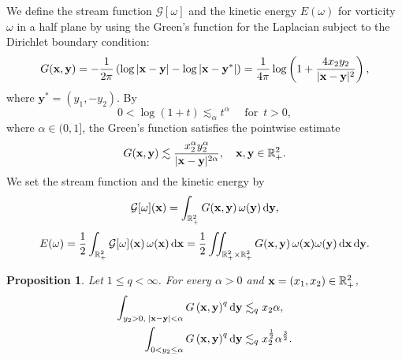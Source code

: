 \documentclass[11pt]{amsart}
\newtheorem{proposition}[theorem]{Proposition}
\theoremstyle{definition}
\theoremstyle{definition}
\numberwithin{equation}{section}
\newcommand{\0}{\emptyset}
\newcommand{\alp}{\alpha}
\newcommand{\omg}{\omega}
\newcommand{\bfx}{{\bf x}}
\newcommand{\bfy}{{\bf y}}
\newcommand{\bbR}{\mathbb R}
\newcommand{\calG}{\mathcal G}
\newcommand{\dd}{\mathrm{d}}
\begin{document}
	We define the stream function $\mathcal{G}[\omega]$ and the kinetic energy $E(\omega)$ for vorticity $\omega$ in a half plane by using the Green's function for the Laplacian subject to the Dirichlet boundary condition:  
	\begin{align}
		G(\bfx, \bfy)=- \frac{1}{2\pi} \left( \log|\bfx-\bfy|  -  \log|\bfx-\bfy^{*}| \right) = \frac{1}{4\pi} \log \left( 1 + \frac{4x_2y_2}{|\bfx - \bfy|^2} \right),  \label{eq: Green}
	\end{align}
	where $\mathbf{y}^* = (y_1, -y_2)$.
	By
	\[
	0<\log{(1+t)}\lesssim_{\alpha} t^{\alpha} \quad \textrm{ for }  \, t>0,
	\]
	where $\alpha\in (0,1]$, the Green's function satisfies the pointwise estimate
	\begin{equation}
		G(\bfx, \bfy) \lesssim \frac{x_2^\alpha y_2^{\alpha}}{|\bfx - \bfy|^{2\alpha}},\quad \bfx,\bfy\in \mathbb{R}^{2}_{+}.  \label{eq: GE}
	\end{equation} 
	We set the stream function and the kinetic energy by 
	\begin{equation}\label{eq:G}
		\begin{split}
			\calG[\omega](\bfx)= \int_{\bbR^2_+} G(\bfx, \bfy)\,\omega(\bfy)\,\dd\bfy,
		\end{split}
	\end{equation} 
	\begin{equation}
		E(\omg)= \frac12 \int_{ \mathbb{R}^{2}_{+}} 	\calG[\omega](\bfx) \,  \omg(\bfx) \,\dd\bfx  =  \frac{1}{2}\iint_{\bbR^2_+ \times \bbR^2_+}G(\bfx,\bfy)\,\omg(\bfx)\omg(\bfy)\,\dd\bfx\,\dd\bfy.  \label{eq: KE}
	\end{equation}
	
	\begin{proposition}\label{lem0801_01}
		Let $1\leq q <\infty$.
		For every  $\alpha>0$ and $\bfx=(x_1,x_2)\in\mathbb{R}^2_+$, 
		\begin{align}
			\int_{y_2>0,\;|\bfx-\bfy|<\alpha}  G \left(\bfx, \bfy\right)^q \dd \bfy  &\lesssim_q   x_2 \alp,   				\label{eq240803_2} \\
			\int_{0 < y_2 \le \alpha} G \left(\bfx, \bfy\right)^q  \dd \bfy   &\lesssim_q  x_2^{\frac{1}{2}}\alpha^{\frac{3}{2}}. \label{eq241003_1}
		\end{align}
	\end{proposition}
	
\end{document}
